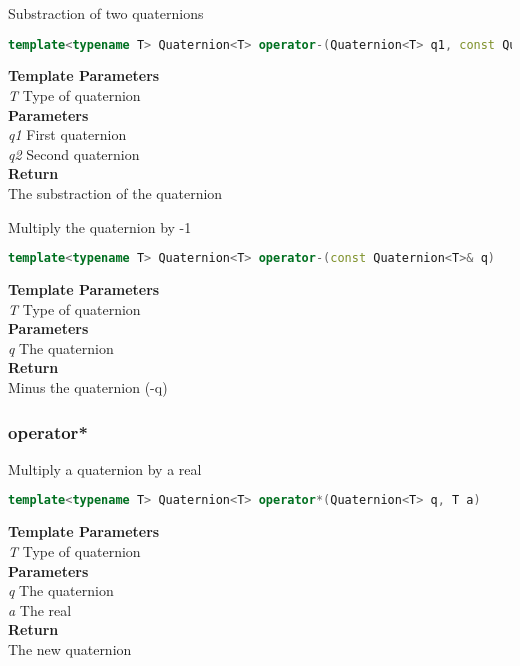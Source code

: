 \begin{mdframed}
Substraction of two quaternions
\begin{lstlisting}[language=C++]
template<typename T> Quaternion<T> operator-(Quaternion<T> q1, const Quaternion<T>& q2) 
\end{lstlisting}
\textbf{Template Parameters} \\ 
\textit{T} Type of quaternion \\ 
\textbf{Parameters} \\ 
\textit{q1} First quaternion \\ 
\textit{q2} Second quaternion \\ 
\textbf{Return} \\ 
The substraction of the quaternion\\ 
\end{mdframed}

\begin{mdframed}
Multiply the quaternion by -1
\begin{lstlisting}[language=C++]
template<typename T> Quaternion<T> operator-(const Quaternion<T>& q) 
\end{lstlisting}
\textbf{Template Parameters} \\ 
\textit{T} Type of quaternion \\ 
\textbf{Parameters} \\ 
\textit{q} The quaternion \\ 
\textbf{Return} \\ 
Minus the quaternion (-q)\\ 
\end{mdframed}

\subsubsection{operator*}
\begin{mdframed}
Multiply a quaternion by a real
\begin{lstlisting}[language=C++]
template<typename T> Quaternion<T> operator*(Quaternion<T> q, T a) 
\end{lstlisting}
\textbf{Template Parameters} \\ 
\textit{T} Type of quaternion \\ 
\textbf{Parameters} \\ 
\textit{q} The quaternion \\ 
\textit{a} The real \\ 
\textbf{Return} \\ 
The new quaternion\\ 
\end{mdframed}

